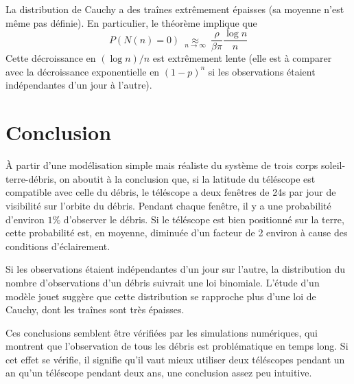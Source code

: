 \documentclass[a4paper,11pt]{article}
\numberwithin{section}{part}
\begin{document}
La distribution de Cauchy a des traînes extrêmement épaisses (sa
moyenne n'est même pas définie). En particulier, le théorème implique
que
\[ P(N(n) = 0)\ \underset{n\to\infty}{\approx}\ \frac{\rho}{\beta \pi}\frac{\log n}{n}\]
Cette décroissance en $(\log n)/n$ est extrêmement lente (elle
est à comparer avec la décroissance exponentielle en $(1-p)^{n}$ si
les observations étaient indépendantes d'un jour à l'autre).





\section{Conclusion}
À partir d'une modélisation simple mais réaliste du système de trois
corps soleil-terre-débris, on aboutit à la conclusion que, si la
latitude du téléscope est compatible avec celle du débris, le
téléscope a deux fenêtres de 24s par jour de visibilité sur l'orbite
du débris. Pendant chaque fenêtre, il y a une probabilité d'environ
$1\%$ d'observer le débris. Si le téléscope est bien positionné sur la
terre, cette probabilité est, en moyenne, diminuée d'un facteur de 2
environ à cause des conditions d'éclairement.

Si les observations étaient indépendantes d'un jour sur l'autre, la
distribution du nombre d'observations d'un débris suivrait une loi
binomiale. L'étude d'un modèle jouet suggère que cette distribution se
rapproche plus d'une loi de Cauchy, dont les traînes sont très
épaisses.

Ces conclusions semblent être vérifiées par les simulations
numériques, qui montrent que l'observation de tous les débris est
problématique en temps long. Si cet effet se vérifie, il signifie
qu'il vaut mieux utiliser deux téléscopes pendant un an qu'un
téléscope pendant deux ans, une conclusion assez peu intuitive.
\end{document}
